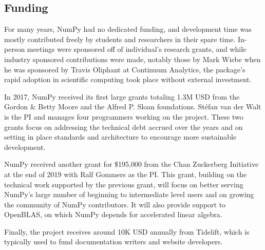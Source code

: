 
\subsection{Funding}

For many years, NumPy had no dedicated funding, and development time
was mostly contributed freely by students and researchers in their
spare time.  In-person meetings were sponsored off of individual's
research grants, and while industry sponsored contributions were made,
notably those by Mark Wiebe when he was sponsored by Travis Oliphant
at Continuum Analytics, the package's rapid adoption in scientific
computing took place without external investment.

In 2017, NumPy received its first large grants totaling 1.3M USD from the
Gordon \& Betty Moore and the Alfred P. Sloan foundations.
Stéfan van der Walt is the PI and manages four programmers working on the project.
These two grants focus on addressing the technical debt accrued over the years and
on setting in place standards and architecture to encourage more sustainable development.

NumPy received another grant for \$195,000 from the Chan Zuckerberg
Initiative at the end of 2019 with Ralf Gommers as the PI.
This grant, building on the technical work supported by the previous
grant, will focus on better serving NumPy's large number of beginning
to intermediate level users and on growing the community of NumPy
contributors.
It will also provide support to OpenBLAS, on which NumPy depends for
accelerated linear algebra.

Finally, the project receives around 10K USD annually from Tidelift, which is
typically used to fund documentation writers and website developers.

